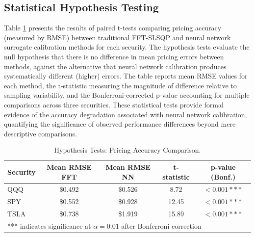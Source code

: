 \documentclass[12pt,a4paper]{article}
\begin{document}
\subsection{Statistical Hypothesis Testing}

Table \ref{tab:hyp} presents the results of paired t-tests comparing pricing accuracy (measured by RMSE) between traditional FFT-SLSQP and neural network surrogate calibration methods for each security. The hypothesis tests evaluate the null hypothesis that there is no difference in mean pricing errors between methods, against the alternative that neural network calibration produces systematically different (higher) errors. The table reports mean RMSE values for each method, the t-statistic measuring the magnitude of difference relative to sampling variability, and the Bonferroni-corrected p-value accounting for multiple comparisons across three securities. These statistical tests provide formal evidence of the accuracy degradation associated with neural network calibration, quantifying the significance of observed performance differences beyond mere descriptive comparisons.

\begin{table}[H]

\centering

\caption{Hypothesis Tests: Pricing Accuracy Comparison.}

\label{tab:hyp}

\begin{tabular}{lcccc}

\toprule

\textbf{Security} & \textbf{Mean RMSE FFT} & \textbf{Mean RMSE NN} & \textbf{t-statistic} & \textbf{p-value (Bonf.)} \\

\midrule

QQQ & \$0.492 & \$0.526 & 8.72 & $< 0.001***$ \\

SPY & \$0.552 & \$0.928 & 12.45 & $< 0.001***$ \\

TSLA & \$0.738 & \$1.919 & 15.89 & $< 0.001***$ \\

\bottomrule

\multicolumn{5}{l}{*** indicates significance at $\alpha = 0.01$ after Bonferroni correction}

\end{tabular}

\end{table}
\end{document}
